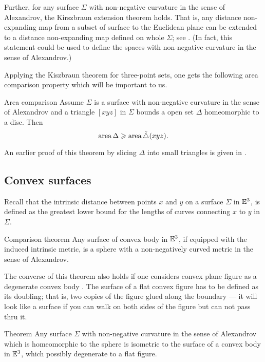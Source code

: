 \documentclass[oneside,a4paper, 12pt]{article}
\begin{document}
Further, for any surface $\Sigma$ with non-negative curvature in the sense of Alexandrov,
the Kirszbraun extension theorem holds.
That is, any distance non-expanding map from a subset of surface to the Euclidean plane can be extended to a distance non-expanding map defined on whole $\Sigma$;
see \cite{lang1997kirszbraun, alexander2011alexandrov}.
(In fact, this statement could be used to define the spaces with non-negative curvature in the sense of Alexandrov.)

Applying the Kiszbraun theorem for three-point sets,
one gets the following area comparison property which will be important to us.

\begin{thm}{Area comparison}\label{Area comparison}
Assume $\Sigma$ is a surface with non-negative curvature in the sense of Alexandrov
and a triangle $[xyz]$ in $\Sigma$ bounds a open set $\Delta$ homeomorphic to a disc.
Then 
\[\mathop{\rm area}\nolimits\Delta\geqslant \mathop{\rm area}\nolimits\tilde\triangle(xyz).\]
\end{thm}
An earlier proof of this theorem by slicing $\Delta$ into small triangles is given in \cite[X \S 1]{ aleksandrov1948vnutrennnyaya}.

\subsection*{Convex surfaces}

Recall that the intrinsic distance between points $x$ and $y$ on a surface $\Sigma$ in $\mathbb{E}^3$, is defined as the  greatest lower bound for the lengths of curves connecting $x$ to $y$ in $\Sigma$.

\begin{thm}{Comparison theorem}\label{Comparison theorem}
Any surface of convex body in $\mathbb{E}^3$,
if equipped with the induced intrinsic metric, 
is a sphere with a non-negatively curved metric in the sense of Alexandrov.
\end{thm}

The converse of this theorem also holds
if one considers convex plane figure as a degenerate convex body \cite[III \S 3]{aleksandrov1948vnutrennnyaya}.
The surface of a flat convex figure has to be defined as its doubling;
that is, two copies 
of the figure glued along the boundary --- it will look like a surface if you can walk on both sides of the figure but can not pass thru it.

\begin{thm}{Theorem}
Any surface $\Sigma$ with non-negative curvature in the sense of Alexandrov which is homeomorphic to the sphere
is isometric to the surface of a convex body in $\mathbb{E}^3$,
which possibly degenerate to a flat figure.
\end{thm}
\end{document}

